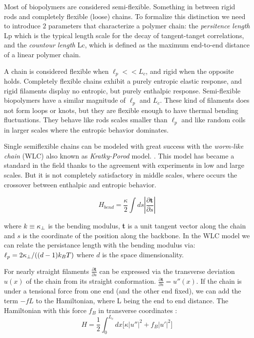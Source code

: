 Most of biopolymers are considered semi-flexible. Something in between
rigid rods and completely flexible (loose) chains.  To formalize this
distinction we need to introduce $2$ parameters that characterize a polymer
chain: the \emph{persitence length} \gls{Lp} which is the typical length scale
for the decay of tangent-tanget correlations, and the \emph{countour length}
\gls{Lc}, which is defined as the maximum end-to-end distance of a linear
polymer chain.

A chain is considered flexible when $\ell_p<<L_c$, and rigid when the opposite
holds. Completely flexible chains exhibit a purely entropic elastic
response, and rigid filaments display no entropic, but purely enthalpic
response. Semi-flexible biopolymers have a similar magnitude of $\ell_p$ and
$L_c$. These kind of filaments does not form loops or knots, but they are
flexible enough to have thermal bending
fluctuations\citep{storm_nonlinear_2005}. They behave like rods scales smaller
than $\ell_p$ and like random coils in larger scales where the entropic behavior
dominates.

Single semiflexible chains can be modeled with great success with the
\emph{worm-like chain} (WLC) also known as \emph{Kratky-Porod} model.
\citep{rubinstein_polymer_2003, schuster_hierarchical_2011}. This model has
became a standard in the field thanks to the agreement with experiments in low
and large scales.
But it is not completely satisfactory in middle scales, where occurs the
crossover between enthalpic and entropic behavior.\citet{hsu_breakdown_2011}

$$H_{bend}=\frac{\kappa}{2} \int ds|\frac{\partial \textbf{t}}{\partial s}|$$

where $k\equiv\kappa_\perp{}$ is the bending modulus, \textbf{t} is a unit tangent
vector along the chain and $s$ is the coordinate of the position along the
backbone. In the WLC model we can relate the persistance length with the bending
modulus via: $\ell_p{}=2\kappa_\perp{}/((d-1)k_B{}T)$ where $d$ is the space
dimensionality.

For nearly straight filaments $\frac{\partial \textbf{t}}{\partial s}$ can be
expressed via the transverse deviation $u(x)$ of the chain from its straight
conformation. $\frac{\partial \textbf{t}}{\partial s}=u''(x)$. If the chain is
under a tensional force from one end (and the other end fixed), we can add the
term $-fL$ to the Hamiltonian, where L being the end to end distance. The
Hamiltonian with this force $f_B$ in transverse coordinates :
\begin{equation}\label{WLC_H}
H=\frac{1}{2}\int_0^{L_c} dx\Big[\kappa|u''|^2 + f_B|u'|^2\Big]
\end{equation}

